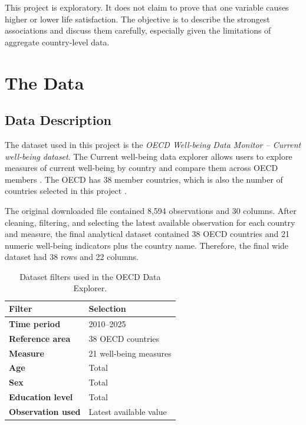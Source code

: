 \documentclass[11pt,a4paper]{article}
\begin{document}
This project is exploratory. It does not claim to prove that one variable causes higher or lower life satisfaction. The objective is to describe the strongest associations and discuss them carefully, especially given the limitations of aggregate country-level data.

\section{The Data}

\subsection{Data Description}

The dataset used in this project is the \textit{OECD Well-being Data Monitor -- Current well-being dataset}. The Current well-being data explorer allows users to explore measures of current well-being by country and compare them across OECD members \cite{oecd_current}. The OECD has 38 member countries, which is also the number of countries selected in this project \cite{oecd_members}.

The original downloaded file contained 8,594 observations and 30 columns. After cleaning, filtering, and selecting the latest available observation for each country and measure, the final analytical dataset contained 38 OECD countries and 21 numeric well-being indicators plus the country name. Therefore, the final wide dataset had 38 rows and 22 columns.

\begin{table}[H]
\centering
\caption{Dataset filters used in the OECD Data Explorer.}
\begin{tabular}{>{\bfseries}ll}
\toprule
Filter & Selection \\
\midrule
Time period & 2010--2025 \\
Reference area & 38 OECD countries \\
Measure & 21 well-being measures \\
Age & Total \\
Sex & Total \\
Education level & Total \\
Observation used & Latest available value \\
\bottomrule
\end{tabular}
\end{table}
\end{document}
